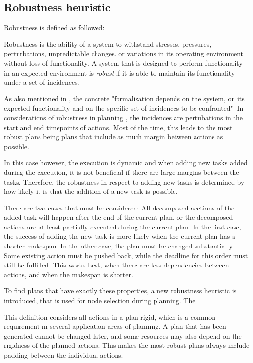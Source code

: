 \subsection{Robustness heuristic}

Robustness is defined as followed:

\begin{definition}
    Robustness is the ability of a system to withstand stresses, pressures, perturbations, unpredictable changes, or variations in its operating environment without loss of functionality.
    A system that is designed to perform functionality in an expected environment is \emph{robust} if it is able to maintain its functionality under a set of incidences. \citep{barberRobustnessStabilityRecoverability2015}
\end{definition}

As also mentioned in \cite{barberRobustnessStabilityRecoverability2015}, the concrete "formalization depends on the system, on its expected functionality and on the specific set of incidences to be confronted".
In considerations of robustness in planning \citep{lundRobustExecutionProbabilistic2017}, the incidences are pertubations in the start and end timepoints of actions.
Most of the time, this leads to the most robust plans being plans that include as much margin between actions as possible.

In this case however, the execution is dynamic and when adding new tasks added during the execution, it is not beneficial if there are large margins between the tasks.
Therefore, the robustness in respect to adding new tasks is determined by how likely it is that the addition of a new task is possible.

There are two cases that must be considered: All decomposed acctions of the added task will happen after the end of the current plan, or the decomposed actions are at least partially executed during the current plan.
In the first case, the success of adding the new task is more likely when the current plan has a shorter makespan.
In the other case, the plan must be changed substantially.
Some existing action must be pushed back, while the deadline for this order must still be fulfilled.
This works best, when there are less dependencies between actions, and when the makespan is shorter.

To find plans that have exactly these properties, a new robustness heuristic is introduced, that is used for node selection during planning.
The 

This definition considers all actions in a plan rigid, which is a common requirement in several application areas of planning.
A plan that has been generated cannot be changed later, and some resources may also depend on the rigidness of the planned actions. 
This makes the most robust plans always include padding between the individual actions.

